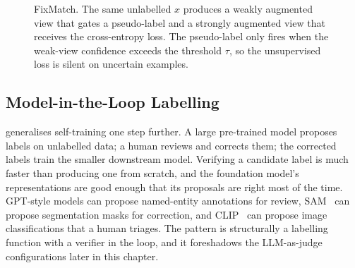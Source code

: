 \begin{figure}
\centering
{}
\caption{FixMatch. The same unlabelled $x$ produces a weakly augmented view that gates a pseudo-label and a strongly augmented view that receives the cross-entropy loss. The pseudo-label only fires when the weak-view confidence exceeds the threshold $\tau$, so the unsupervised loss is silent on uncertain examples.}
\label{fig:fixmatch}
\end{figure}

\subsection{Model-in-the-Loop Labelling}

 generalises self-training one step further. A large pre-trained model proposes labels on unlabelled data; a human reviews and corrects them; the corrected labels train the smaller downstream model.
Verifying a candidate label is much faster than producing one from scratch, and the foundation model's representations are good enough that its proposals are right most of the time.
GPT-style models can propose named-entity annotations for review, SAM~\cite{Kirillov2023SAM} can propose segmentation masks for correction, and CLIP~\cite{Radford2021CLIP} can propose image classifications that a human triages.
The pattern is structurally a labelling function with a verifier in the loop, and it foreshadows the LLM-as-judge configurations later in this chapter.


